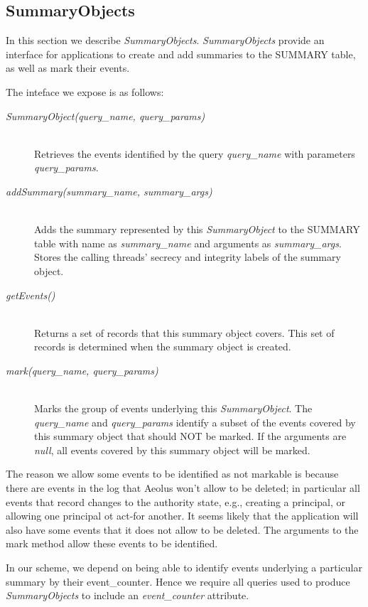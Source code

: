 \subsection{SummaryObjects}
\label{model:summary-objects}

In this section we describe \emph{SummaryObjects}. \emph{SummaryObjects} provide an interface for applications to create and add summaries to the SUMMARY table, as well as mark their events.

The inteface we expose is as follows:
\begin{description}
  \item[\emph{SummaryObject(query\_name, query\_params)}] \ \\
    Retrieves the events identified by the query
    \emph{query\_name} with parameters \emph{query\_params}.
  \item[\emph{addSummary(summary\_name, summary\_args)}] \ \\
    Adds the summary represented by this 
    \emph{SummaryObject} to the SUMMARY table with
    name as \emph{summary\_name} and arguments
    as \emph{summary\_args}.
    Stores the calling threads' secrecy and integrity
    labels of the summary object.
  \item[\emph{getEvents()}] \ \\
    Returns a set of records that this summary object
    covers.
    This set of records is determined when the summary
    object is created.
  \item[\emph{mark(query\_name, query\_params)}] \ \\
    Marks the group of events underlying this
    \emph{SummaryObject}. The \emph{query\_name}
    and \emph{query\_params} identify a subset
    of the events covered by this summary object
    that should NOT be marked.
    If the arguments are \emph{null}, all events
    covered by this summary object will be marked.
\end{description}

\noindent
The reason we allow some events to be identified as not markable is because there are events in the log that Aeolus won't allow to be deleted; in particular all events that record changes to the authority state, e.g., creating a principal, or allowing one principal ot act-for another. It seems likely that the application will also have some events that it does not allow to be deleted. The arguments to the mark method allow these events to be identified.

In our scheme, we depend on being able to identify events underlying a particular summary by their event\_counter. Hence we require all queries used to produce \emph{SummaryObjects} to include an \emph{event\_counter} attribute.

